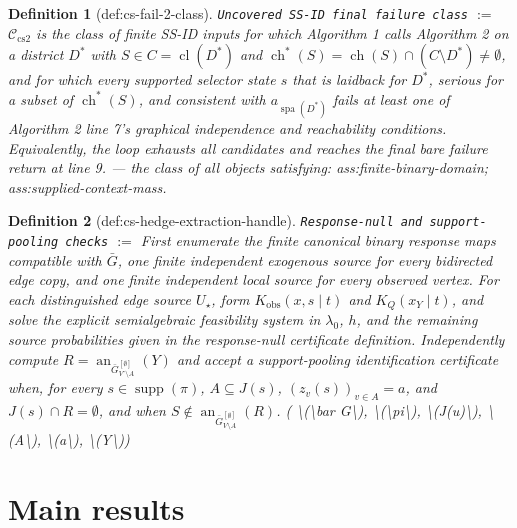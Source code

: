 \documentclass{article}
\newtheorem{definition}{Definition}
\begin{document}
\begin{definition}[def:cs-fail-2-class]\label{def:cs-fail-2-class}
\texttt{Uncovered SS-ID final failure class} $:=$ \(\mathcal C_{\mathrm{cs2}}\) is the class of finite SS-ID inputs for which Algorithm 1 calls Algorithm 2 on a district \(D^\ast\) with \(S\in C=\operatorname{cl}(D^\ast)\) and \(\operatorname{ch}^\ast(S)=\operatorname{ch}(S)\cap(C\setminus D^\ast)\ne\emptyset\), and for which every supported selector state \(s\) that is laidback for \(D^\ast\), serious for a subset of \(\operatorname{ch}^\ast(S)\), and consistent with \(a_{\operatorname{spa}(D^\ast)}\) fails at least one of Algorithm 2 line 7's graphical independence and reachability conditions. Equivalently, the loop exhausts all candidates and reaches the final bare failure return at line 9. --- the class of all objects satisfying: ass:finite-binary-domain; ass:supplied-context-mass.
\end{definition}

\begin{definition}[def:cs-hedge-extraction-handle]\label{def:cs-hedge-extraction-handle}
\texttt{Response-null and support-pooling checks} $:=$ First enumerate the finite canonical binary response maps compatible with \(\bar G\), one finite independent exogenous source for every bidirected edge copy, and one finite independent local source for every observed vertex. For each distinguished edge source \(U_\star\), form \(K_{\mathrm{obs}}(x,s\mid t)\) and \(K_Q(x_Y\mid t)\), and solve the explicit semialgebraic feasibility system in \(\lambda_0\), \(h\), and the remaining source probabilities given in the response-null certificate definition. Independently compute \(R=\operatorname{an}_{\bar G^{[\emptyset]}_{V^\circ\setminus A}}(Y)\) and accept a support-pooling identification certificate when, for every \(s\in\operatorname{supp}(\pi)\), \(A\subseteq J(s)\), \((z_v(s))_{v\in A}=a\), and \(J(s)\cap R=\emptyset\), and when \(S\notin\operatorname{an}_{\bar G^{[\emptyset]}_{V\setminus A}}(R)\). \quad ( \textbackslash{}(\textbackslash{}bar G\textbackslash{}), \textbackslash{}(\textbackslash{}pi\textbackslash{}), \textbackslash{}(J(u)\textbackslash{}), \textbackslash{}(A\textbackslash{}), \textbackslash{}(a\textbackslash{}), \textbackslash{}(Y\textbackslash{}))
\end{definition}

\section{Main results}
\end{document}
